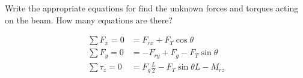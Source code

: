 Write the appropriate equations for find the unknown forces and torques acting on the beam. How many equations are there?

\begin{solution}
\begin{align*}
    \sum F_x = 0 &= F_{rx} + F_T\cos{\theta} \\
    \sum F_y = 0 &= -F_{ry} + F_g - F_T\sin{\theta} \\
    \sum \tau_z = 0 &= F_g\frac{L}{2} - F_T\sin{\theta}L - M_{rz}
\end{align*}
\end{solution}